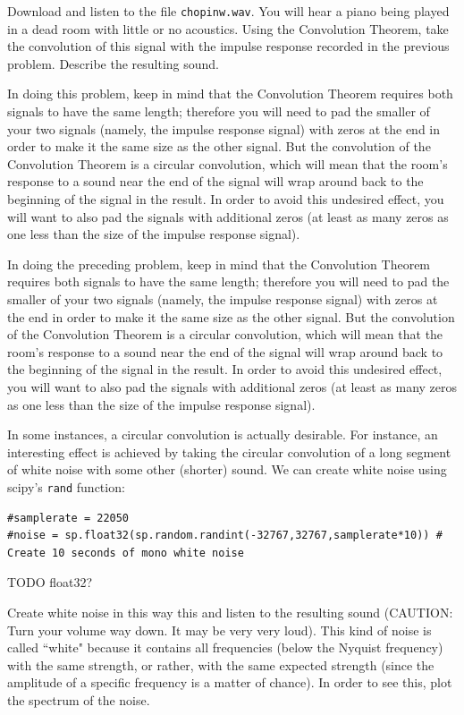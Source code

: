 \begin{problem}\label{convolution_problem}
Download and listen to the file \texttt{chopinw.wav}. You will hear a piano being played in a dead room with little or no acoustics. Using the Convolution Theorem, take the convolution of this signal with the impulse response recorded in the previous problem. Describe the resulting sound.

In doing this problem, keep in mind that the Convolution Theorem requires both signals to have the same length; therefore you will need to pad the smaller of your two signals (namely, the impulse response signal) with zeros at the end in order to make it the same size as the other signal. But the convolution of the Convolution Theorem is a circular convolution, which will mean that the room's response to a sound near the end of the signal will wrap around back to the beginning of the signal in the result. In order to avoid this undesired effect, you will want to also pad the signals with additional zeros (at least as many zeros as one less than the size of the impulse response signal).
\end{problem}

In doing the preceding problem, keep in mind that the Convolution Theorem requires both signals to have the same length; therefore you will need to pad the smaller of your two signals (namely, the impulse response signal) with zeros at the end in order to make it the same size as the other signal. But the convolution of the Convolution Theorem is a circular convolution, which will mean that the room's response to a sound near the end of the signal will wrap around back to the beginning of the signal in the result. In order to avoid this undesired effect, you will want to also pad the signals with additional zeros (at least as many zeros as one less than the size of the impulse response signal).

In some instances, a circular convolution is actually desirable. For instance, an interesting effect is achieved by taking the circular convolution of a long segment of white noise with some other (shorter) sound. We can create white noise using scipy's \texttt{rand} function:
\begin{lstlisting}
#samplerate = 22050
#noise = sp.float32(sp.random.randint(-32767,32767,samplerate*10)) # Create 10 seconds of mono white noise
\end{lstlisting}

TODO float32?

\begin{problem}
Create white noise in this way this and listen to the resulting sound (CAUTION: Turn your volume way down.  It may be very very loud).  This kind of noise is called ``white" because it contains all frequencies (below the Nyquist frequency) with the same strength, or rather, with the same expected strength (since the amplitude of a specific frequency is a matter of chance). In order to see this, plot the spectrum of the noise.
\end{problem}

